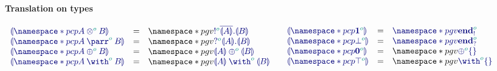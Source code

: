 
\begin{figure}[h]
\paragraph*{Translation on types}
  \[
  \begin{array}{lcl}
    \ty{\cpgvT{\pcp{\tytens[\cs{o}]{A}{B}}}}
    & = & \pgv{\ty{\tysend[\cs{o}]{\co{\cpgvT{A}}}{\cpgvT{B}}}} \\
    \ty{\cpgvT{\pcp{\typarr[\cs{o}]{A}{B}}}}
    & = & \pgv{\ty{\tyrecv[\cs{o}]{\cpgvT{A}}{\cpgvT{B}}}} \\
    \ty{\cpgvT{\pcp{\typlus[\cs{o}]{A}{B}}}}
    & = & \pgv{\ty{\tyselect[\cs{o}]{\cpgvT{A}}{\cpgvT{B}}}} \\
    \ty{\cpgvT{\pcp{\tywith[\cs{o}]{A}{B}}}}
    & = & \pgv{\ty{\tyoffer[\cs{o}]{\cpgvT{A}}{\cpgvT{B}}}}
  \end{array}
  \quad
  \begin{array}{lcl}
    \ty{\cpgvT{\pcp{\tyone[\cs{o}]}}}
    & = & \ty{\pgv{\tyends[\cs{o}]}} \\
    \ty{\cpgvT{\pcp{\tybot[\cs{o}]}}}
    & = & \ty{\pgv{\tyendr[\cs{o}]}} \\
    \ty{\cpgvT{\pcp{\tynil[\cs{o}]}}}
    & = & \pgv{\ty{\tyselectemp[\cs{o}]}} \\
    \ty{\cpgvT{\pcp{\tytop[\cs{o}]}}}
    & = & \pgv{\ty{\tyofferemp[\cs{o}]}}
  \end{array}
  \]
  

\end{figure}
